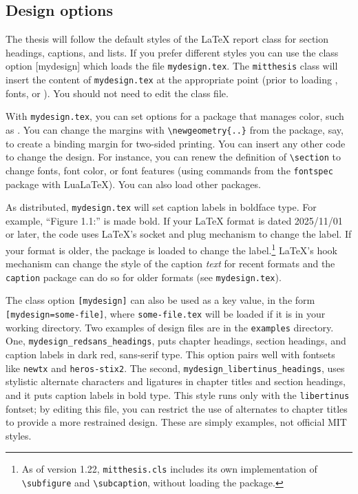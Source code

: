 \documentclass[11pt]{article}
\newcommand*\LuaLaTeX{Lua\LaTeX}
\begin{document}
\subsection{Design options}

The thesis will follow the default styles of the \LaTeX{} report class for section headings, captions, and lists.  If you prefer different styles you can use the class option [mydesign] which loads the file \texttt{mydesign.tex}. The \texttt{mitthesis} class will insert the content of \texttt{mydesign.tex} at the appropriate point (prior to loading , fonts, or \texttt{}). You should not need to edit the class file.

With \texttt{mydesign.tex}, you can set options for a package that manages color, such as \texttt{}. You can change the margins with \verb|\newgeometry{..}| from the \texttt{} package, say, to create a binding margin for two-sided printing. You can insert any other code to change the design. For instance, you can renew the definition of \verb+\section+ to change fonts, font color, or font features (using commands from the \texttt{fontspec} package with \LuaLaTeX). You can also load other packages.

As distributed, \texttt{mydesign.tex} will set caption labels in boldface type. For example, ``Figure 1.1:'' is made bold. 
If your \LaTeX{} format is dated 2025/11/01 or later, the code uses \LaTeX's socket and plug mechanism to change the label.
 If your format is older, the \texttt{} package is loaded to change the label.\footnote{As of version 1.22, \texttt{mitthesis.cls} includes its own implementation of \texttt{\textbackslash subfigure} and \texttt{\textbackslash subcaption}, without loading the \texttt{} package.} \LaTeX's hook mechanism can change the style of the caption \textit{text} for recent formats and the \texttt{caption} package can do so for older formats (see \texttt{mydesign.tex}).
 
The class option \texttt{[mydesign]} can also be used as a key value, in the form \texttt{[mydesign=some-file]}, where \texttt{some-file.tex} will be loaded if it is in your working directory. Two examples of design files are in the \texttt{examples} directory. One, \verb+mydesign_redsans_headings+, puts chapter headings, section headings, and caption labels in dark red, sans-serif type. This option pairs well with fontsets like \texttt{newtx} and \texttt{heros-stix2}. The second, \verb+mydesign_libertinus_headings+, uses stylistic alternate characters and ligatures in chapter titles and section headings, and it puts caption labels in bold type. This style runs only with the \texttt{libertinus} fontset; by editing this file, you can restrict the use of alternates to chapter titles to provide a more restrained design.  These are simply examples, not official MIT styles.
\end{document}
